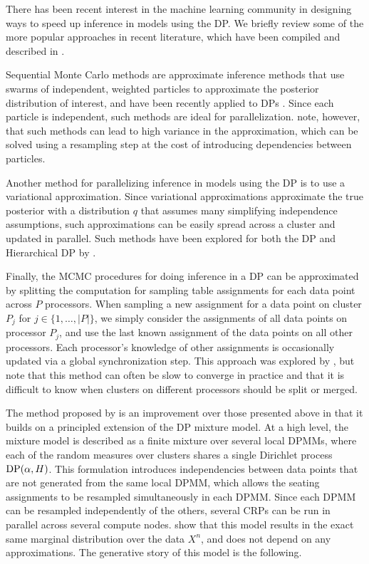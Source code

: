 There has been recent interest in the machine learning community in
designing ways to speed up inference in models using the DP. We
briefly review some of the more popular approaches in recent
literature, which have been compiled and described in
\cite{williamson2013}.

Sequential Monte Carlo methods are approximate inference methods that
use swarms of independent, weighted particles to approximate the
posterior distribution of interest, and have been recently applied to
DPs \cite{fearnhead2004, ulker2010, rodriguez2011, ahmed2011}. Since
each particle is independent, such methods are ideal for
parallelization. \cite{williamson2013} note, however, that such
methods can lead to high variance in the approximation, which can be
solved using a resampling step at the cost of introducing dependencies
between particles.

Another method for parallelizing inference in models using the DP is
to use a variational approximation. Since variational approximations
approximate the true posterior with a distribution $q$ that assumes
many simplifying independence assumptions, such approximations can be
easily spread across a cluster and updated in parallel. Such methods
have been explored for both the DP and Hierarchical DP by
\cite{blei2004, kurihara2007, teh2008, wang2011}.

Finally, the MCMC procedures for doing inference in a DP can be
approximated by splitting the computation for sampling table
assignments for each data point across $P$ processors. When sampling a
new assignment for a data point on cluster $P_j$ for $j \in \{1,
\ldots, |P|\}$, we simply consider the assignments of all data points
on processor $P_j$, and use the last known assignment of the data
points on all other processors. Each processor's knowledge of other
assignments is occasionally updated via a global synchronization
step. This approach was explored by \cite{asuncion2008}, but
\cite{williamson2013} note that this method can often be slow to
converge in practice and that it is difficult to know when clusters on
different processors should be split or merged.

The method proposed by \cite{williamson2013} is an improvement over
those presented above in that it builds on a principled extension of
the DP mixture model. At a high level, the mixture model is described
as a finite mixture over several local DPMMs, where each of the random
measures over clusters shares a single Dirichlet process $\mathrm{DP}(\alpha,
H)$. This formulation introduces independencies between data points
that are not generated from the same local DPMM, which allows the
seating assignments to be resampled simultaneously in each DPMM. Since
each DPMM can be resampled independently of the others, several CRPs
can be run in parallel across several compute
nodes. \cite{williamson2013} show that this model results in the exact
same marginal distribution over the data $X^n$, and does not depend on
any approximations. The generative story of this model is the
following.

